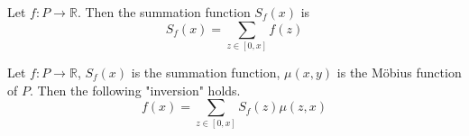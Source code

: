 \begin{definition}
    Let $f: P \to \mathbb{R}$. Then the summation function $S_f(x)$ is
    \[
    S_f(x) = \sum_{z \in [0, x]} f(z)
    \]
\end{definition}

\begin{theorem}
    Let $f: P \to \mathbb{R}$, $S_f(x)$ is the summation function, $\mu(x, y)$ is the Möbius function of $P$. Then the following "inversion" holds.
    \[
    f(x) = \sum_{z \in [0, x]} S_f(z) \mu(z, x)
    \]
\end{theorem}